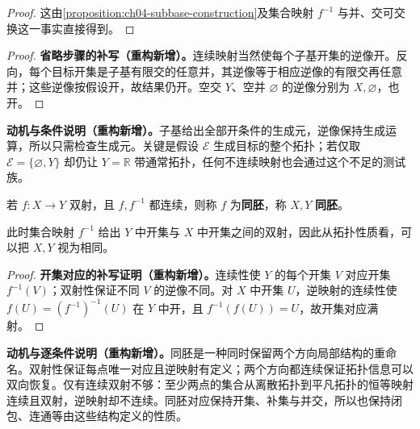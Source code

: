 \documentclass[../../main.tex]{subfiles}%
\begin{document}
\begin{proof}
这由\cref{proposition:ch04-subbase-construction}及集合映射 $f^{-1}$ 与并、交可交换这一事实直接得到。
\end{proof}
\begin{proof}
\textbf{省略步骤的补写（重构新增）。}连续映射当然使每个子基开集的逆像开。反向，每个目标开集是子基有限交的任意并，其逆像等于相应逆像的有限交再任意并；这些逆像按假设开，故结果仍开。空交 $Y$、空并 $\varnothing$ 的逆像分别为 $X,\varnothing$，也开。
\end{proof}
\begin{remark}
\textbf{动机与条件说明（重构新增）。}子基给出全部开条件的生成元，逆像保持生成运算，所以只需检查生成元。关键是假设 $\mathcal E$ 生成目标的整个拓扑；若仅取 $\mathcal E=\{\varnothing,Y\}$ 却仍让 $Y=\mathbb R$ 带通常拓扑，任何不连续映射也会通过这个不足的测试族。
\end{remark}
\begin{definition}[同胚]\label{definition:ch04-homeomorphism}
若 $f:X\to Y$ 双射，且 $f,f^{-1}$ 都连续，则称 $f$ 为\textbf{同胚}，称 $X,Y$ \textbf{同胚}。
\end{definition}
\begin{proposition}\label{proposition:ch04-homeomorphism-open-correspondence}
此时集合映射 $f^{-1}$ 给出 $Y$ 中开集与 $X$ 中开集之间的双射，因此从拓扑性质看，可以把 $X,Y$ 视为相同。
\end{proposition}
\begin{proof}
\textbf{开集对应的补写证明（重构新增）。}连续性使 $Y$ 的每个开集 $V$ 对应开集 $f^{-1}(V)$；双射性保证不同 $V$ 的逆像不同。对 $X$ 中开集 $U$，逆映射的连续性使 $f(U)=(f^{-1})^{-1}(U)$ 在 $Y$ 中开，且 $f^{-1}(f(U))=U$，故开集对应满射。
\end{proof}
\begin{remark}
\textbf{动机与逐条件说明（重构新增）。}同胚是一种同时保留两个方向局部结构的重命名。双射性保证每点唯一对应且逆映射有定义；两个方向都连续保证拓扑信息可以双向恢复。仅有连续双射不够：至少两点的集合从离散拓扑到平凡拓扑的恒等映射连续且双射，逆映射却不连续。同胚对应保持开集、补集与并交，所以也保持闭包、连通等由这些结构定义的性质。
\end{remark}
\end{document}
